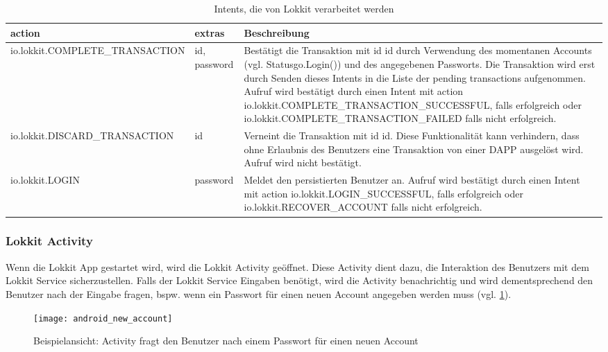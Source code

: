 \begin{table}[H]
\centering
\caption{Intents, die von Lokkit verarbeitet werden}
\label{tbl:LokktService_ListenIntents}
\begin{tabular}{@{}L{3cm}L{2cm}L{10cm}@{}}
\toprule
action & extras & Beschreibung\\ \midrule
io.lokkit.\newline{}COMPLETE\newline{}\_TRANSACTION & id, password & Bestätigt die Transaktion mit id id durch Verwendung des momentanen Accounts (vgl. Statusgo.Login()) und des angegebenen Passworts. Die Transaktion wird erst durch Senden dieses Intents in die Liste der pending transactions aufgenommen. Aufruf wird bestätigt durch einen Intent mit action io.lokkit.COMPLETE\_TRANSACTION\_SUCCESSFUL, falls erfolgreich oder io.lokkit.COMPLETE\_TRANSACTION\_FAILED falls nicht erfolgreich. \\\midrule
io.lokkit.\newline{}DISCARD\newline{}\_TRANSACTION  & id           & Verneint die Transaktion mit id id. Diese Funktionalität kann verhindern, dass ohne Erlaubnis des Benutzers eine Transaktion von einer DAPP ausgelöst wird. Aufruf wird nicht bestätigt.\\\midrule
io.lokkit.\newline{}LOGIN & password     & Meldet den persistierten Benutzer an. Aufruf wird bestätigt durch einen Intent mit action io.lokkit.LOGIN\_SUCCESSFUL, falls erfolgreich oder io.lokkit.RECOVER\_ACCOUNT falls nicht erfolgreich.
\\ \bottomrule
\end{tabular}
\end{table}

\subsubsection{Lokkit Activity}
\label{sys_subsubsec:Lokkit_Activity}
Wenn die Lokkit App gestartet wird, wird die Lokkit Activity geöffnet. Diese Activity dient dazu, die Interaktion des Benutzers mit dem Lokkit Service sicherzustellen. Falls der Lokkit Service Eingaben benötigt, wird die Activity benachrichtig und wird dementsprechend den Benutzer nach der Eingabe fragen, bspw. wenn ein Passwort für einen neuen Account angegeben werden muss (vgl. \ref{fig:sys_android_new_account}).

\begin{figure}[H]
\centering
\texttt{[image: android\_new\_account]}
\caption{Beispielansicht: Activity fragt den Benutzer nach einem Passwort für einen neuen Account}
\label{fig:sys_android_new_account}
\end{figure}



